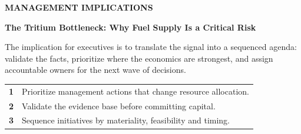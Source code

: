 \documentclass[10pt,a4paper]{article}
\begin{document}
\clearpage
{\textcolor{BOBlue}{\scriptsize\bfseries MANAGEMENT IMPLICATIONS}}\par\vspace{-1pt}
{\Large\sffamily\bfseries\color{BONavy} The Tritium Bottleneck: Why Fuel Supply Is a Critical Risk}\par\vspace{4pt}
{\small The implication for executives is to translate the signal into a sequenced agenda: validate the facts, prioritize where the economics are strongest, and assign accountable owners for the next wave of decisions.}\par
\begin{tabularx}{\linewidth}{p{10mm}Y}
\textcolor{BOBlue}{\bfseries 1} & Prioritize management actions that change resource allocation. \\[5pt]
\textcolor{BOBlue}{\bfseries 2} & Validate the evidence base before committing capital. \\[5pt]
\textcolor{BOBlue}{\bfseries 3} & Sequence initiatives by materiality, feasibility and timing. \\[5pt]
\end{tabularx}
\vspace{6pt}

\vspace{6pt}{\textcolor{BOBlue}{\scriptsize\bfseries EXECUTION ROADMAP}}\par
\begin{center}
\end{center}
\end{document}
